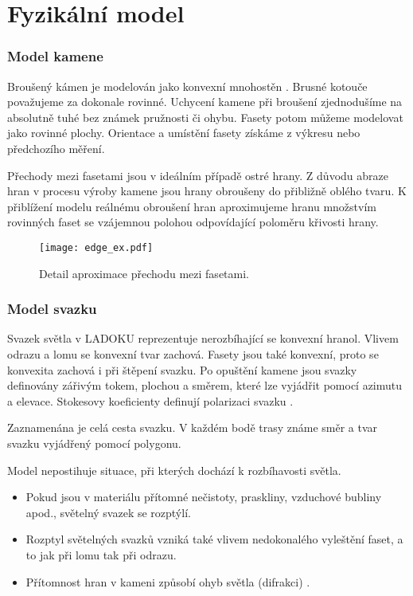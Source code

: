 \part{Fyzikální model}

\section{Model kamene}
Broušený kámen je modelován jako konvexní mnohostěn \cite{Pohl2002}. Brusné kotouče považujeme za dokonale rovinné. Uchycení kamene při broušení zjednodušíme na absolutně tuhé bez známek pružnosti či ohybu. Fasety potom můžeme modelovat jako rovinné plochy. Orientace a umístění fasety získáme z výkresu nebo předchozího měření. 

Přechody mezi fasetami jsou v ideálním případě ostré hrany. Z důvodu abraze hran v procesu výroby kamene jsou hrany obroušeny do přibližně oblého tvaru. K přiblížení modelu reálnému obroušení hran aproximujeme hranu množstvím rovinných faset se vzájemnou polohou odpovídající poloměru křivosti hrany.  
  
\begin{figure}[htps]
\centering
\texttt{[image: edge\_ex.pdf]}
\caption{Detail aproximace přechodu mezi fasetami.}
\label{fig: edge}
\end{figure}  

\section{Model svazku}
Svazek světla v LADOKU reprezentuje nerozbíhající se konvexní hranol. Vlivem odrazu a lomu se konvexní tvar zachová. Fasety jsou také konvexní, proto se konvexita zachová i při štěpení svazku. Po opuštění kamene jsou svazky definovány zářivým tokem, plochou a směrem, které lze vyjádřit pomocí azimutu a elevace. Stokesovy koeficienty definují polarizaci svazku \cite{bodlakLADOK}. 

Zaznamenána je celá cesta svazku. V každém bodě trasy známe směr a tvar svazku vyjádřený pomocí polygonu. 

Model nepostihuje situace, při kterých dochází k rozbíhavosti světla.
\begin{itemize}
\item Pokud jsou v materiálu přítomné nečistoty, praskliny, vzduchové bubliny apod., světelný svazek se rozptýlí.
\item Rozptyl světelných svazků vzniká také vlivem nedokonalého vyleštění faset, a to jak při lomu tak při odrazu.
\item Přítomnost hran v kameni způsobí ohyb světla (difrakci) \cite{HandbookDiff}.
\end{itemize}


